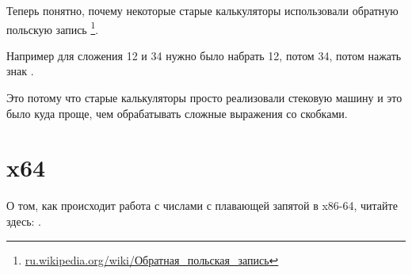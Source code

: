 Теперь понятно, почему некоторые старые калькуляторы использовали обратную польскую запись
\footnote{\href{http://go.yurichev.com/17355}{ru.wikipedia.org/wiki/Обратная\_польская\_запись}}.

Например для сложения 12 и 34 нужно было набрать 12, потом 34, потом нажать знак .

Это потому что старые калькуляторы просто реализовали стековую машину и это было куда проще, чем обрабатывать сложные выражения со скобками.

\section{x64}

О том, как происходит работа с числами с плавающей запятой в x86-64, читайте здесь: .

\ifdefined\IncludeExercises

\fi

